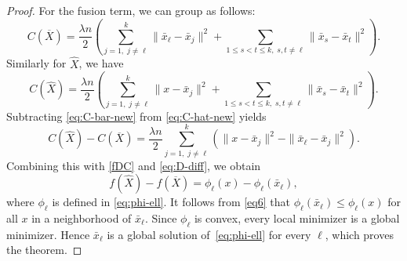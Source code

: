 \documentclass[10pt,a4paper]{amsart}
\def\Bar{\overline}
\begin{document}
\begin{proof}
For the fusion term, we can group as follows:
\begin{equation}\label{eq:C-bar-new}
C(\Bar{X}) = \frac{\lambda n}{2} \left( \sum_{j=1,\; j \neq \ell}^k \|\bar{x}_\ell - \bar{x}_j\|^2 + \sum_{1 \le s < t \le k,\; s,t \neq \ell} \|\bar{x}_s - \bar{x}_t\|^2 \right).
\end{equation}
Similarly for $\widehat{X}$, we have
\begin{equation}\label{eq:C-hat-new}
C(\widehat{X}) = \frac{\lambda n}{2} \left( \sum_{j=1,\; j \neq \ell}^k \|x - \bar{x}_j\|^2 + \sum_{1 \le s < t \le k,\; s,t \neq \ell} \|\bar{x}_s - \bar{x}_t\|^2 \right).
\end{equation}
Subtracting \eqref{eq:C-bar-new} from \eqref{eq:C-hat-new} yields
\begin{equation*}\label{eq:C-diff}
C(\widehat{X}) - C(\Bar{X}) = \frac{\lambda n}{2} \sum_{j=1,\; j \neq \ell}^k \left( \|x - \bar{x}_j\|^2 - \|\bar{x}_\ell - \bar{x}_j\|^2 \right).
\end{equation*}
Combining this with \eqref{fDC} and
\eqref{eq:D-diff}, we obtain
\begin{equation}
f(\widehat X) - f(\Bar X) = \phi_\ell(x) - \phi_\ell(\bar x_\ell),
\end{equation}
where $\phi_\ell$ is defined in \eqref{eq:phi-ell}. It follows from \eqref{eq6} that
$\phi_\ell(\bar x_\ell) \le \phi_\ell(x)$ for all $x$ in a neighborhood of $\bar x_\ell$. 
Since $\phi_\ell$ is convex,
every local minimizer is a global minimizer. Hence
$\bar x_\ell$ is a global solution of~\eqref{eq:phi-ell} for every $\ell$,
which proves the theorem.
\end{proof}
\end{document}
